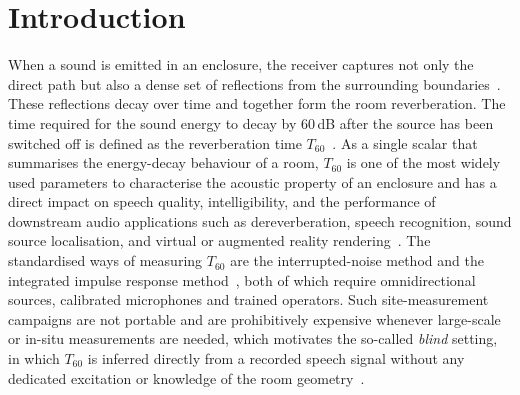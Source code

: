 \documentclass[a4paper,fleqn]{cas-sc}
\begin{document}
\maketitle

\section{Introduction}

When a sound is emitted in an enclosure, the receiver captures not only
the direct path but also a dense set of reflections from the surrounding
boundaries~\citep{kuttruff2013room}. These reflections decay over time and
together form the room reverberation. The time required for the sound
energy to decay by 60\,dB after the source has been switched off is
defined as the reverberation time $T_{60}$~\citep{iso3382_2_2008}. As a
single scalar that summarises the energy-decay behaviour of a room,
$T_{60}$ is one of the most widely used parameters to characterise the
acoustic property of an enclosure and has a direct impact on speech
quality, intelligibility, and the performance of downstream audio
applications such as dereverberation, speech recognition, sound source
localisation, and virtual or augmented reality
rendering~\citep{benzeghiba2007asrreview, anthes2016vr}. The standardised
ways of measuring $T_{60}$ are the interrupted-noise method and the
integrated impulse response method~\citep{schroeder1965rt}, both of which
require omnidirectional sources, calibrated microphones and trained
operators. Such site-measurement campaigns are not portable and are
prohibitively expensive whenever large-scale or in-situ measurements are
needed, which motivates the so-called \emph{blind} setting, in which
$T_{60}$ is inferred directly from a recorded speech signal without any
dedicated excitation or knowledge of the room
geometry~\citep{eaton2016ace}.
\end{document}
